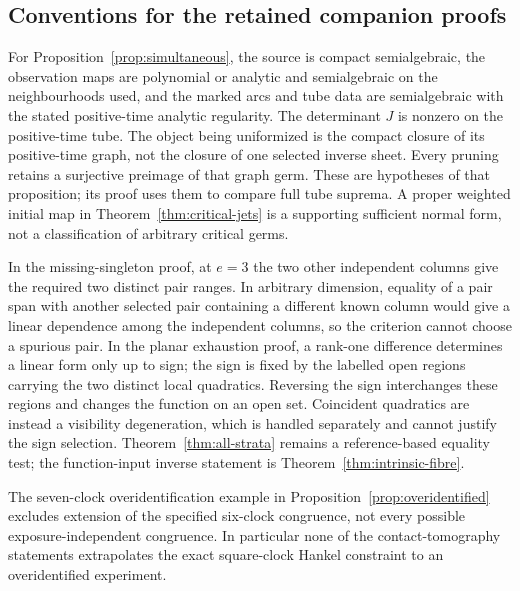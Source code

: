 \subsection{Conventions for the retained companion proofs}
For Proposition~\ref{prop:simultaneous}, the source is compact semialgebraic, the observation maps are polynomial or analytic and semialgebraic on the neighbourhoods used, and the marked arcs and tube data are semialgebraic with the stated positive-time analytic regularity. The determinant $J$ is nonzero on the positive-time tube. The object being uniformized is the compact closure of its positive-time graph, not the closure of one selected inverse sheet. Every pruning retains a surjective preimage of that graph germ. These are hypotheses of that proposition; its proof uses them to compare full tube suprema. A proper weighted initial map in Theorem~\ref{thm:critical-jets} is a supporting sufficient normal form, not a classification of arbitrary critical germs.

In the missing-singleton proof, at $e=3$ the two other independent columns give the required two distinct pair ranges. In arbitrary dimension, equality of a pair span with another selected pair containing a different known column would give a linear dependence among the independent columns, so the criterion cannot choose a spurious pair. In the planar exhaustion proof, a rank-one difference determines a linear form only up to sign; the sign is fixed by the labelled open regions carrying the two distinct local quadratics. Reversing the sign interchanges these regions and changes the function on an open set. Coincident quadratics are instead a visibility degeneration, which is handled separately and cannot justify the sign selection. Theorem~\ref{thm:all-strata} remains a reference-based equality test; the function-input inverse statement is Theorem~\ref{thm:intrinsic-fibre}.

The seven-clock overidentification example in Proposition~\ref{prop:overidentified} excludes extension of the specified six-clock congruence, not every possible exposure-independent congruence. In particular none of the contact-tomography statements extrapolates the exact square-clock Hankel constraint to an overidentified experiment.
